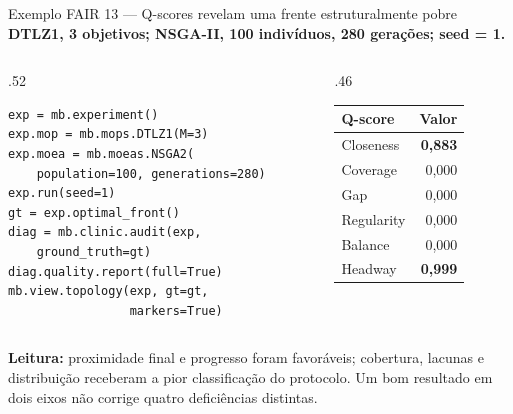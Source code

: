 \begin{frame}[fragile]{Exemplo FAIR 13 — Q-scores revelam uma frente estruturalmente pobre}
\textbf{DTLZ1, 3 objetivos; NSGA-II, 100 indivíduos, 280 gerações; seed = 1.}
\begin{columns}[T,onlytextwidth]
\begin{column}{.52\textwidth}
\begin{lstlisting}[style=python,basicstyle=\ttfamily\fontsize{7.3}{9.3}\selectfont]
exp = mb.experiment()
exp.mop = mb.mops.DTLZ1(M=3)
exp.moea = mb.moeas.NSGA2(
    population=100, generations=280)
exp.run(seed=1)
gt = exp.optimal_front()
diag = mb.clinic.audit(exp,
    ground_truth=gt)
diag.quality.report(full=True)
mb.view.topology(exp, gt=gt,
                 markers=True)
\end{lstlisting}
\end{column}
\begin{column}{.46\textwidth}\centering
\renewcommand{\arraystretch}{1.12}
\begin{tabular}{@{}lr@{}}
\textbf{Q-score} & \textbf{Valor}\\\hline
Closeness & \textbf{0,883}\\
Coverage & 0,000\\
Gap & 0,000\\
Regularity & 0,000\\
Balance & 0,000\\
Headway & \textbf{0,999}\\
\end{tabular}
\end{column}
\end{columns}
\vspace{.10cm}\textbf{Leitura:} proximidade final e progresso foram favoráveis; cobertura, lacunas e distribuição receberam a pior classificação do protocolo. Um bom resultado em dois eixos não corrige quatro deficiências distintas.
\end{frame}

